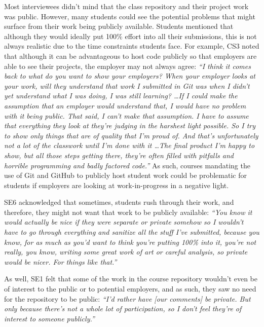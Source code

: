 Most interviewees didn't mind that the class repository and their project work was public. However, many students could see the potential problems that might surface from their work being publicly available. Students mentioned that although they would ideally put 100\% effort into all their submissions, this is not always realistic due to the time constraints students face. For example, CS3 noted that although it can be advantageous to host code publicly so that employers are able to see their projects, the employer may not always agree: \textit{``I think it comes back to what do you want to show your employers? When your employer looks at your work, will they understand that work I submitted in Git was when I didn't yet understand what I was doing, I was still learning? \ldots If I could make the assumption that an employer would understand that, I would have no problem with it being public. That said, I can't make that assumption. I have to assume that everything they look at they're judging in the harshest light possible. So I try to show only things that are of quality that I'm proud of. And that's unfortunately not a lot of the classwork until I'm done with it \ldots The final product I'm happy to show, but all those steps getting there, they're often filled with pitfalls and horrible programming and badly factored code.''} As such, courses mandating the use of Git and GitHub to publicly host student work could be problematic for students if employers are looking at work-in-progress in a negative light.

SE6 acknowledged that sometimes, students rush through their work, and therefore, they might not want that work to be publicly available: \textit{``You know it would actually be nice if they were separate or private somehow so I wouldn't have to go through everything and sanitize all the stuff I've submitted, because you know, for as much as you'd want to think you're putting 100\% into it, you're not really, you know, writing some great work of art or careful analysis, so private would be nicer. For things like that.''}

As well, SE1 felt that some of the work in the course repository wouldn't even be of interest to the public or to potential employers, and as such, they saw no need for the repository to be public: \textit{``I'd rather have [our comments] be private. But only because there's not a whole lot of participation, so I don't feel they're of interest to someone publicly.''}

